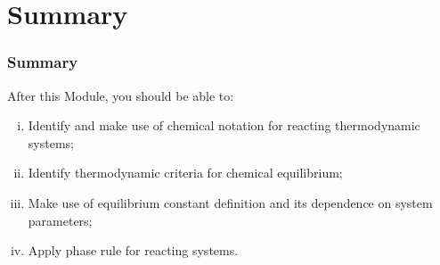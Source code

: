 \documentclass[10pt,compress]{beamer}
\begin{document}
\section{Summary}

\begin{frame}
 \frametitle{Summary}
   After this Module, you should be able to:
   \begin{enumerate}[(i)]
     \item Identify and make use of chemical notation for reacting thermodynamic systems;
     \item Identify thermodynamic criteria for chemical equilibrium;
     \item Make use of equilibrium constant definition and its dependence on system parameters;
     \item Apply phase rule for reacting systems.
   \end{enumerate}
\end{frame}
\end{document}
